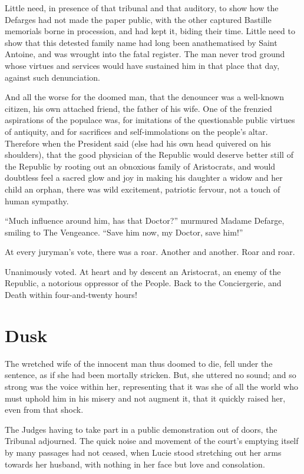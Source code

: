 Little need, in presence of that tribunal and that auditory, to show
how the Defarges had not made the paper public, with the other
captured Bastille memorials borne in procession, and had kept it,
biding their time.  Little need to show that this detested family
name had long been anathematised by Saint Antoine, and was wrought
into the fatal register.  The man never trod ground whose virtues and
services would have sustained him in that place that day, against
such denunciation.

And all the worse for the doomed man, that the denouncer was a
well-known citizen, his own attached friend, the father of his wife.
One of the frenzied aspirations of the populace was, for imitations
of the questionable public virtues of antiquity, and for sacrifices
and self-immolations on the people's altar.  Therefore when the
President said (else had his own head quivered on his shoulders),
that the good physician of the Republic would deserve better still of
the Republic by rooting out an obnoxious family of Aristocrats, and
would doubtless feel a sacred glow and joy in making his daughter a
widow and her child an orphan, there was wild excitement, patriotic
fervour, not a touch of human sympathy.

``Much influence around him, has that Doctor?'' murmured Madame Defarge,
smiling to The Vengeance.  ``Save him now, my Doctor, save him!''

At every juryman's vote, there was a roar.  Another and another.
Roar and roar.

Unanimously voted.  At heart and by descent an Aristocrat, an enemy
of the Republic, a notorious oppressor of the People.  Back to the
Conciergerie, and Death within four-and-twenty hours!



\chapter{Dusk}


The wretched wife of the innocent man thus doomed to die, fell under
the sentence, as if she had been mortally stricken.  But, she uttered
no sound; and so strong was the voice within her, representing that
it was she of all the world who must uphold him in his misery and not
augment it, that it quickly raised her, even from that shock.

The Judges having to take part in a public demonstration out of
doors, the Tribunal adjourned.  The quick noise and movement of the
court's emptying itself by many passages had not ceased, when Lucie
stood stretching out her arms towards her husband, with nothing in
her face but love and consolation.

